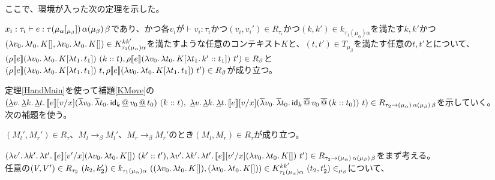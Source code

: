 \\
ここで、環境が入った次の定理を示した。
\begin{theorem}
  $x_i:\tau_i \vdash e:\tau \TrailsType{\alpha}{\beta} \TrailType{\beta}$であり、かつ各$v_i$が$\vdash v_i:\tau_i$かつ$(v_i,v_i') \in R_{\tau_i}$かつ$(k,k')\in k_{\tau_1(\mu_{\alpha})\alpha}$を満たす$k,k'$かつ$(\Lam{v_0}{\Lam{t_0}{K[]}}, \Lam{v_0}{\Lam{t_0}{K[]}})\in  K^{kk'}_{\tau_1(\mu_{\alpha})\alpha}$を満たすような任意のコンテキスト$K$と、$(t, t') \in T_{\mu_{\beta}}$を満たす任意の$t, t'$とについて、\\
  $(\rho \CPSTh{e} \LamP{v_0}{\Lam{t_0}{K[\Lam{t_1}{t_1}]}}\ \ConsP{k}{t}, \rho \CPSTh{e} \LamP{v_0}{\Lam{t_0}{K[\Lam{t_1}{\Cons{k'}{t_1}}]}}\ t')\in R_{\beta}$と\\
  $(\rho \CPSTh{e} \LamP{v_0}{\Lam{t_0}{K[\Lam{t_1}{t_1}]}}\ t, \rho \CPSTh{e} \LamP{v_0}{\Lam{t_0}{K[\Lam{t_1}{t_1}]}}\ t')\in R_{\beta}$が成り立つ。
\label{HandMain}
\end{theorem}
定理\ref{HandMain}を使って補題\ref{KMove}の\\
$(\DLam{v}{\DLam{k}{\DLam{t}{\CPSTh{e}[\Change{x}{v}] \SLamP{v_0}{\SLam{t_0}{\DApp{\Idk}{\DApp{v_0}{t_0}}}}\ \ConsP{k}{t}}}},\\
\ \DLam{v}{\DLam{k}{\DLam{t}{\CPSTh{e}[\Change{x}{v}] \SLamP{v_0}{\SLam{t_0}{\SApp{\Idk}{\SApp{v_0}{\ConsP{k}{t_0}}}}}\ t}}})
\in R_{\tau_2 \rightarrow \TrailType{\alpha} \TrailType{\beta}}$を示していく。\\
次の補題を使う。\\
\begin{lemma}[簡約と論理関係の保存]
  $(M_l', M_r') \in R_{\tau}、M_l \rightarrow_{\beta} M_l'、M_r \rightarrow_{\beta} M_r'$のとき$(M_l, M_r) \in R_{\tau}$が成り立つ。
\label{Reduction2}
\end{lemma}
$(\Lam{v'}{\Lam{k'}{\Lam{t'}{\CPSTh{e}[\Change{x}{v'}] \LamP{v_0}{\Lam{t_0}{K[]}}\ \ConsP{k'}{t'}}}},\\
\Lam{v'}{\Lam{k'}{\Lam{t'}{\CPSTh{e}[\Change{x}{v'}] \LamP{v_0}{\Lam{t_0}{K[]}}\ t'}}})
\in R_{\tau_2 \rightarrow \TrailType{\alpha} \TrailType{\beta}}$をまず考える。
\\
任意の$(V,V')\in R_{\tau_2}\  (k_2,k_2')\in k_{\tau_1(\mu_{\alpha})\alpha}\  (\LamP{v_0}{\Lam{t_0}{K[]}},\LamP{v_0}{\Lam{t_0}{K[]}})\in K^{kk'}_{\tau_1(\mu_{\alpha})\alpha}\  (t_2,t_2')\in_{\mu_{\beta}}$について、\\
